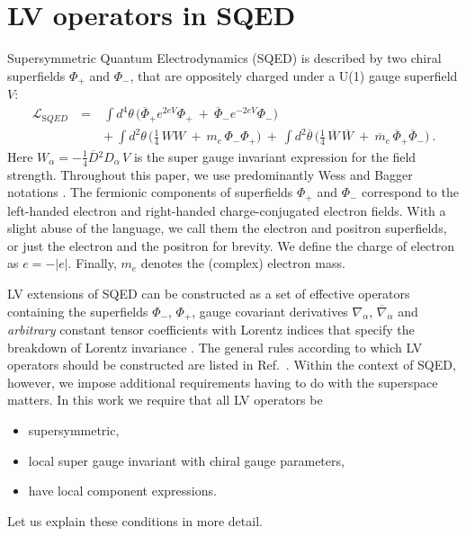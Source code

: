 \documentclass[12pt]{revtex4}
\begin{document}
\section{LV operators in SQED} 
\label{LVoperators}


Supersymmetric Quantum Electrodynamics (SQED) is described
by two chiral superfields $ \Phi_+ $ and $ \Phi_- $, that 
are oppositely charged under a U(1) gauge superfield $ V $: 
\begin{eqnarray}
\mathcal{L}_{\mathrm SQED} & ~=~
&
\int d^4\theta\, \Big(
   \overline{\Phi}_+ e^{2eV} \Phi_+ ~+~
   \overline{\Phi}_- e^{-2eV} {\Phi}_-  \Big) \\
\label{SQED}
&& +~   
\int d^2\theta\, \Big( \frac{1}{4}\,  WW ~+~m_e\, \Phi_-\Phi_+ \Big) ~+~
\int d^2\overline{\theta}\, 
\Big( \frac{1}{4}\, \overline{W}\,\overline{W} ~+~ 
\overline{m}_e\, \overline{\Phi}_+\overline{\Phi}_- \Big)~.
\nonumber
\end{eqnarray}
%
Here $ W_\alpha = - \frac{1}{4} \overline{D}{}^2 D_\alpha\, {V} $ 
is the super gauge invariant expression for the field strength. 
Throughout this paper, we use predominantly Wess and
Bagger notations \cite{Wess:1992cp}. The fermionic components of
superfields $ \Phi_+ $ and $ \Phi_- $ correspond to the left-handed
electron and right-handed charge-conjugated electron fields. With a   
slight abuse of the language, we call them the electron and positron 
superfields, or just the electron and the positron for brevity. We
define the charge of electron as $ e = - | e | $. 
Finally, $m_e$ denotes the (complex) electron mass. 


LV extensions of SQED can be constructed as a set of effective
operators containing the superfields $\Phi_-$, $\Phi_+$,
gauge covariant derivatives $ \nabla_\alpha $, 
$ \overline{\nabla}_{\dot\alpha} $ and {\em arbitrary} constant tensor
coefficients with Lorentz indices  that specify the
breakdown of Lorentz invariance \cite{GrootNibbelink:2004za}. 
The general rules according to which LV operators should be
constructed are listed in Ref.\ \cite{MP:}. 
Within the context of SQED, however, we impose additional
requirements having to do with the superspace matters.
In this work we require
that all LV operators be  
\begin{itemize}
\item supersymmetric, 
\item local super gauge invariant with chiral gauge parameters, 
\item have local component expressions. 
\end{itemize}
Let us explain these conditions in more detail. 
\end{document}
